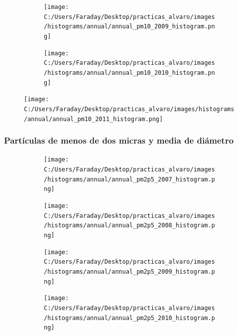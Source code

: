 \documentclass[12pt]{article}
\begin{document}
\begin{figure}[H]
\centering
\begin{subfigure}[h]{0.45\textwidth}
\texttt{[image: C:/Users/Faraday/Desktop/practicas\_alvaro/images/histograms/annual/annual\_pm10\_2009\_histogram.png]}
\caption{}
\label{fig:hist-ann-3-3}
\end{subfigure}
%
\begin{subfigure}[H]{0.45\textwidth}
\texttt{[image: C:/Users/Faraday/Desktop/practicas\_alvaro/images/histograms/annual/annual\_pm10\_2010\_histogram.png]}
\caption{}
\label{fig:hist-ann-3-4}
\end{subfigure}
\caption{}
\end{figure}

\begin{figure}[H]
\centering
\texttt{[image: C:/Users/Faraday/Desktop/practicas\_alvaro/images/histograms/annual/annual\_pm10\_2011\_histogram.png]}
\label{fig:hist-ann-3-5}
\caption{}
\end{figure}

\newpage

\subsubsection*{Partículas de menos de dos micras y media de diámetro}
%

\begin{figure}[H]
\centering
\begin{subfigure}[h]{0.45\textwidth}
\texttt{[image: C:/Users/Faraday/Desktop/practicas\_alvaro/images/histograms/annual/annual\_pm2p5\_2007\_histogram.png]}
\caption{}
\label{fig:hist-ann-4-1}
\end{subfigure}
%
\begin{subfigure}[H]{0.45\textwidth}
\texttt{[image: C:/Users/Faraday/Desktop/practicas\_alvaro/images/histograms/annual/annual\_pm2p5\_2008\_histogram.png]}
\caption{}
\label{fig:hist-ann-4-2}
\end{subfigure}
\caption{}
\end{figure}

\begin{figure}[H]
\centering
\begin{subfigure}[h]{0.45\textwidth}
\texttt{[image: C:/Users/Faraday/Desktop/practicas\_alvaro/images/histograms/annual/annual\_pm2p5\_2009\_histogram.png]}
\caption{}
\label{fig:hist-ann-4-3}
\end{subfigure}
%
\begin{subfigure}[H]{0.45\textwidth}
\texttt{[image: C:/Users/Faraday/Desktop/practicas\_alvaro/images/histograms/annual/annual\_pm2p5\_2010\_histogram.png]}
\caption{}
\label{fig:hist-ann-4-4}
\end{subfigure}
\caption{}
\end{figure}
\end{document}
